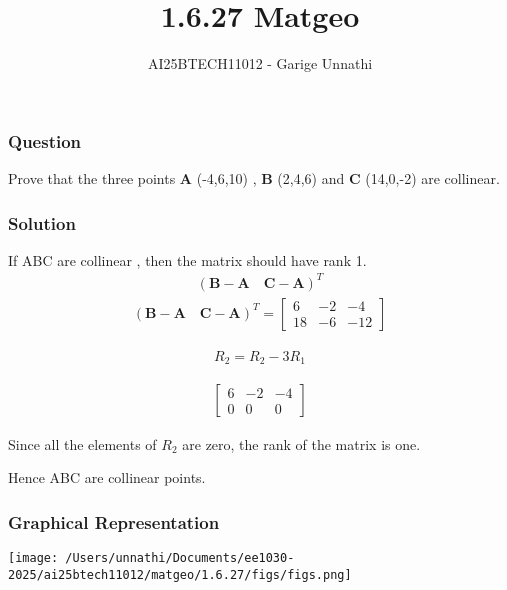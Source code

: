 \documentclass{beamer}
\title{1.6.27 Matgeo}
\author{AI25BTECH11012 - Garige Unnathi}
\date{}
\begin{document}
\frame{\titlepage}

\begin{frame}
\frametitle{Question}
Prove that the three points \textbf{A} (-4,6,10) , \textbf{B} (2,4,6) and \textbf{C} (14,0,-2) are collinear.
\\\end{frame}




\begin{frame}
\frametitle{Solution}
 If ABC are collinear , then the matrix should have rank 1.
 \begin{align*}
{(\textbf{B} - \textbf{A} \quad \textbf{C} - \textbf{A})}^T
\end{align*}
\begin{align}
    {(\textbf{B} - \textbf{A} \quad \textbf{C} - \textbf{A})}^T =  
    \begin{bmatrix}
      6 & -2 & -4 \\
      18 & -6 & -12   
    \end{bmatrix}
\end{align}

\begin{align}
    R_2 = R_2 - 3R_1
\end{align}


\begin{align}
 \begin{bmatrix}    
6 & -2 & -4 \\
0 & 0 & 0 
\end{bmatrix}
\end{align}

 \end{frame}





\begin{frame}
Since all the elements of $R_2$ are zero, the rank of the matrix is one.

Hence ABC are collinear points.

\frametitle{Graphical Representation}
\begin{center}
\texttt{[image: /Users/unnathi/Documents/ee1030-2025/ai25btech11012/matgeo/1.6.27/figs/figs.png]}
\end{center}
\end{frame}
\end{document}
